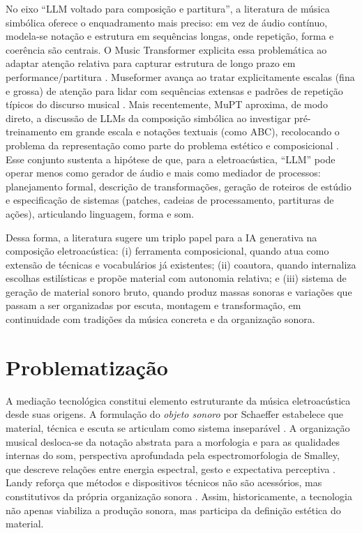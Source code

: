 No eixo “LLM voltado para composição e partitura”, a literatura de música simbólica oferece o enquadramento mais preciso: em vez de áudio contínuo, modela-se notação e estrutura em sequências longas, onde repetição, forma e coerência são centrais. O Music Transformer explicita essa problemática ao adaptar atenção relativa para capturar estrutura de longo prazo em performance/partitura \cite{huang2018musictransformer}. Museformer avança ao tratar explicitamente escalas (fina e grossa) de atenção para lidar com sequências extensas e padrões de repetição típicos do discurso musical \cite{zeng2022museformer}. Mais recentemente, MuPT aproxima, de modo direto, a discussão de LLMs da composição simbólica ao investigar pré-treinamento em grande escala e notações textuais (como ABC), recolocando o problema da representação como parte do problema estético e composicional \cite{qu2024mupt}. Esse conjunto sustenta a hipótese de que, para a eletroacústica, “LLM” pode operar menos como gerador de áudio e mais como mediador de processos: planejamento formal, descrição de transformações, geração de roteiros de estúdio e especificação de sistemas (patches, cadeias de processamento, partituras de ações), articulando linguagem, forma e som.

Dessa forma, a literatura sugere um triplo papel para a IA generativa na composição eletroacústica: (i) ferramenta composicional, quando atua como extensão de técnicas e vocabulários já existentes; (ii) coautora, quando internaliza escolhas estilísticas e propõe material com autonomia relativa; e (iii) sistema de geração de material sonoro bruto, quando produz massas sonoras e variações que passam a ser organizadas por escuta, montagem e transformação, em continuidade com tradições da música concreta e da organização sonora.


\section{Problematização}

A mediação tecnológica constitui elemento estruturante da música eletroacústica desde suas origens. A formulação do \emph{objeto sonoro} por Schaeffer estabelece que material, técnica e escuta se articulam como sistema inseparável \cite{schaeffer1966traite}. A organização musical desloca-se da notação abstrata para a morfologia e para as qualidades internas do som, perspectiva aprofundada pela espectromorfologia de Smalley, que descreve relações entre energia espectral, gesto e expectativa perceptiva \cite{smalley1997spectromorphology}. Landy reforça que métodos e dispositivos técnicos não são acessórios, mas constitutivos da própria organização sonora \cite{landy2007soundorganization}. Assim, historicamente, a tecnologia não apenas viabiliza a produção sonora, mas participa da definição estética do material.

